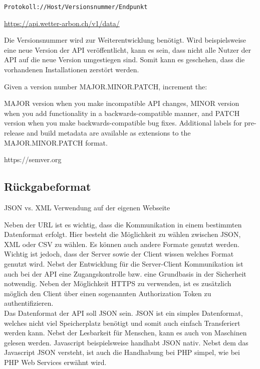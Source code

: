 \texttt{Protokoll://Host/Versionsnummer/Endpunkt}

\url{https://api.wetter-arbon.ch/v1/data/}

Die Versionsnummer wird zur Weiterentwicklung benötigt. Wird beispielsweise eine neue Version der API veröffentlicht, kann es sein, dass nicht alle Nutzer der API auf die neue Version umgestiegen sind. Somit kann es geschehen, dass die vorhandenen Installationen zerstört werden.

Given a version number MAJOR.MINOR.PATCH, increment the:

MAJOR version when you make incompatible API changes,
MINOR version when you add functionality in a backwards-compatible manner, and
PATCH version when you make backwards-compatible bug fixes.
Additional labels for pre-release and build metadata are available as extensions to the MAJOR.MINOR.PATCH format.



https://semver.org




\subsection{Rückgabeformat}
JSON vs. XML
Verwendung auf der eigenen Webseite

 Neben der URL ist es wichtig, dass die Kommunikation in einem bestimmten Datenformat erfolgt. Hier besteht die Möglichkeit zu wählen zwischen JSON, XML oder CSV zu wählen. Es können auch andere Formate genutzt werden. Wichtig ist jedoch, dass der Server sowie der Client wissen welches Format genutzt wird. Nebst der Entwicklung für die Server-Client Kommunikation ist auch bei der API eine Zugangskontrolle bzw. eine Grundbasis in der Sicherheit notwendig. Neben der Möglichkeit HTTPS zu verwenden, ist es zusätzlich möglich den Client über einen sogenannten Authorization Token zu authentifizieren.\\

Das Datenformat der API soll JSON sein. JSON ist ein simples Datenformat, welches nicht viel Speicherplatz benötigt und somit auch einfach Transferiert werden kann. Nebst der Lesbarkeit für Menschen, kann es auch von Maschinen gelesen werden. Javascript beispielsweise handhabt JSON nativ. Nebst dem das Javascript JSON versteht, ist auch die Handhabung bei PHP simpel, wie bei PHP Web Services \cite{LornaJaneMitchell2013oreilly} erwähnt wird.

